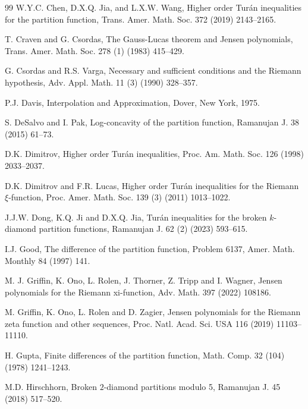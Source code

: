 \documentclass[12pt]{article}
\numberwithin{equation}{section}
\begin{document}
\begin{thebibliography}{99}
W.Y.C. Chen, D.X.Q. Jia, and L.X.W. Wang, Higher order
Tur\'an inequalities for the partition function, Trans. Amer. Math. Soc.
372  (2019)  2143--2165.

T. Craven and G. Csordas, The Gauss-Lucas theorem and Jensen polynomials, Trans. Amer. Math. Soc. 278 (1) (1983) 415--429.

G. Csordas and R.S. Varga, Necessary and sufficient conditions and the Riemann hypothesis, Adv. Appl. Math. 11 (3) (1990) 328--357.

P.J. Davis, Interpolation and Approximation, Dover, New York, 1975.

S. DeSalvo and I. Pak,  Log-concavity of the partition function, Ramanujan J.  38 (2015) 61--73.

D.K. Dimitrov, Higher order Tur\'an inequalities,  Proc. Am. Math. Soc. 126 (1998) 2033--2037.

D.K. Dimitrov and F.R. Lucas, Higher order Tur\'{a}n inequalities for the Riemann $\xi$-function, Proc. Amer. Math. Soc. 139 (3) (2011) 1013--1022.

J.J.W. Dong, K.Q. Ji and D.X.Q. Jia, Tur\'{a}n inequalities for the broken $k$-diamond partition functions, Ramanujan J. 62 (2) (2023) 593--615.

I.J. Good, The difference of the partition function, Problem 6137, Amer. Math. Monthly 84 (1997) 141.

M. J. Griffin, K. Ono, L. Rolen, J. Thorner, Z. Tripp and I. Wagner, Jensen polynomials for the Riemann xi-function, Adv. Math. 397 (2022) 108186.

M. Griffin, K. Ono, L. Rolen and D. Zagier, Jensen polynomials for the Riemann zeta function and other sequences, Proc. Natl. Acad. Sci.
USA 116 (2019) 11103--11110.

H. Gupta, Finite differences of the partition function, Math. Comp. 32 (104) (1978) 1241--1243.


M.D. Hirschhorn,  Broken $2$-diamond partitions modulo 5, Ramanujan J. 45 (2018)  517--520.


\end{thebibliography}
\end{document}
